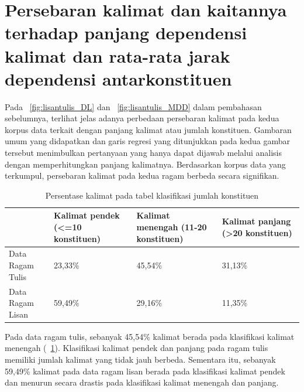 \section{Persebaran kalimat dan kaitannya terhadap panjang dependensi kalimat dan rata-rata jarak dependensi antarkonstituen}

Pada \pic~\ref{fig:lisantulis_DL}  dan \pic~\ref{fig:lisantulis_MDD} dalam pembahasan sebelumnya, terlihat jelas adanya perbedaan persebaran kalimat pada kedua korpus data terkait dengan panjang kalimat atau jumlah konstituen. Gambaran umum yang didapatkan dan garis regresi yang ditunjukkan pada kedua gambar tersebut menimbulkan pertanyaan yang hanya dapat dijawab melalui analisis dengan memperhitungkan panjang kalimatnya. Berdasarkan korpus data yang terkumpul, persebaran kalimat pada kedua ragam berbeda secara signifikan. 

\begin{table}
\begin{center}
\begin{small}
   \caption{Persentase kalimat pada tabel klasifikasi jumlah konstituen}  \label{tab:presentase_kalimat}
  \begin{tabular}{ |p{3cm} | p{3cm} | p{3cm} | p{3cm} |}
    \hline
 & Kalimat pendek \newline (\textless=10 konstituen) & Kalimat menengah (11-20 konstituen) & Kalimat panjang (\textgreater20 konstituen) \\ \hline
Data Ragam Tulis & 23,33\% & 45,54\% & 31,13\% \\ \hline
Data Ragam Lisan & 59,49\% & 29,16\% & 11,35\% \\ \hline
  \end{tabular}
  \end{small}
\end{center}
\end{table}

Pada data ragam tulis, sebanyak 45,54\% kalimat berada pada klasifikasi kalimat menengah (\tab~\ref{tab:presentase_kalimat}). Klasifikasi kalimat pendek dan panjang pada ragam tulis memiliki jumlah kalimat yang tidak jauh berbeda. Sementara itu, sebanyak 59,49\% kalimat pada data ragam lisan berada pada klasifikasi kalimat pendek dan menurun secara drastis pada klasifikasi kalimat menengah dan panjang.  

